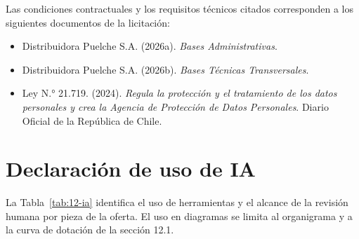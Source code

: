 Las condiciones contractuales y los requisitos técnicos citados corresponden a los siguientes documentos de la licitación:

\begin{itemize}
\item Distribuidora Puelche S.A. (2026a). \emph{Bases Administrativas}.
\item Distribuidora Puelche S.A. (2026b). \emph{Bases Técnicas Transversales}.
\item Ley N.° 21.719. (2024). \emph{Regula la protección y el tratamiento de los datos personales y crea la Agencia de Protección de Datos Personales}. Diario Oficial de la República de Chile.
\end{itemize}

\clearpage
\section*{Declaración de uso de IA}
{}

La Tabla~\ref{tab:12-ia} identifica el uso de herramientas y el alcance de la revisión humana por pieza de la oferta. El uso en diagramas se limita al organigrama y a la curva de dotación de la sección 12.1.

